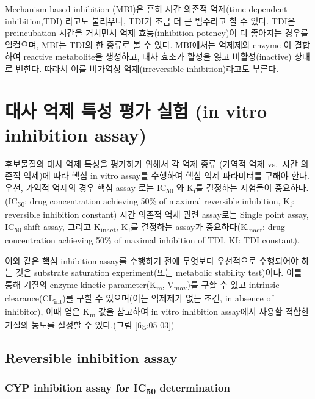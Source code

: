 \documentclass[
  11pt,
  krantz2, a4paper, twoside]{krantz}
\begin{document}
Mechanism-based inhibition (MBI)은 흔히 시간 의존적 억제(time-dependent
inhibition,TDI) 라고도 불리우나, TDI가 조금 더 큰 범주라고 할 수 있다.
TDI은 preincubation 시간을 거치면서 억제 효능(inhibition potency)이 더
좋아지는 경우를 일컬으며, MBI는 TDI의 한 종류로 볼 수 있다. MBI에서는
억제제와 enzyme 이 결합하여 reactive metabolite을 생성하고, 대사 효소가
활성을 잃고 비활성(inactive) 상태로 변한다. 따라서 이를 비가역성
억제(irreversible inhibition)라고도 부른다.

\section{대사 억제 특성 평가 실험 (in vitro inhibition assay)}\label{uxb300uxc0ac-uxc5b5uxc81c-uxd2b9uxc131-uxd3c9uxac00-uxc2e4uxd5d8-in-vitro-inhibition-assay-1}

후보물질의 대사 억제 특성을 평가하기 위해서 각 억제 종류 (가역적 억제
vs.~시간 의존적 억제)에 따라 핵심 in vitro assay를 수행하여 핵심 억제
파라미터를 구해야 한다. 우선, 가역적 억제의 경우 핵심 assay 로는 IC\textsubscript{50}
와 K\textsubscript{i}를 결정하는 시험들이 중요하다.(IC\textsubscript{50}: drug concentration
achieving 50\% of maximal reversible inhibition, K\textsubscript{i}: reversible
inhibition constant) 시간 의존적 억제 관련 assay로는 Single point assay,
IC\textsubscript{50} shift assay, 그리고 K\textsubscript{inact}, K\textsubscript{I}를 결정하는 assay가
중요하다(K\textsubscript{inact}: drug concentration achieving 50\% of maximal
inhibition of TDI, KI: TDI constant).

이와 같은 핵심 inhibition assay를 수행하기 전에 무엇보다 우선적으로
수행되어야 하는 것은 substrate saturation experiment(또는 metabolic
stability test)이다. 이를 통해 기질의 enzyme kinetic parameter(K\textsubscript{m},
V\textsubscript{max})를 구할 수 있고 intrinsic clearance(CL\textsubscript{int})를 구할 수
있으며(이는 억제제가 없는 조건, in absence of inhibitor), 이때 얻은 K\textsubscript{m}
값을 참고하여 in vitro inhibition assay에서 사용할 적합한 기질의 농도를
설정할 수 있다.(그림 \ref{fig:05-03})

\subsection{Reversible inhibition assay}\label{reversible-inhibition-assay}

\subsubsection{\texorpdfstring{CYP inhibition assay for IC\textsubscript{50} determination}{CYP inhibition assay for IC50 determination}}\label{cyp-inhibition-assay-for-ic50-determination}
\end{document}
